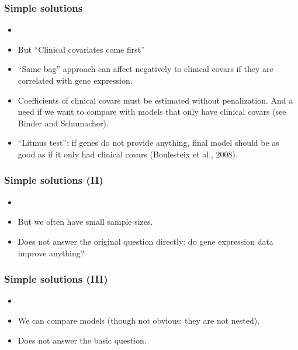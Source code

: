 \begin{frame}
\frametitle{Simple solutions}
\begin{itemize}
\item {}
\item But ``Clinical covariates come first''
\item ``Same bag'' approach can affect negatively to clinical covars if
  they are correlated with gene expression.
\item Coefficients of clinical covars must be estimated without
  penalization. And a need if we want to compare with models that only
  have clinical covars
  (see Binder and Schumacher).
\item ``Litmus test'': if genes do not provide anything, final model
  should be as good as if it only had clinical covars (Boulesteix et
  al., 2008).
\end{itemize}
\end{frame}


\begin{frame}
\frametitle{Simple solutions (II)}
\begin{itemize}
\item {}
\item But we often have small sample sizes.
\item Does not answer the original question directly: do gene expression
  data improve anything?
\end{itemize}
\end{frame}

\begin{frame}
\frametitle{Simple solutions (III)}
\begin{itemize}
\item {}
\item We can compare models (though not obvious: they are not nested).
\item Does not answer the basic question.
\end{itemize}
\end{frame}


